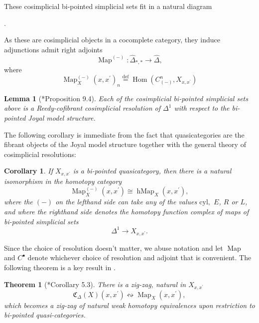 \documentclass[a4paper]{article}
\numberwithin{equation}{subsection}
\theoremstyle{plain}   %
\newtheorem{thm}[equation]{Theorem}
\newtheorem{cor}[equation]{Corollary}
\newtheorem{lemma}[equation]{Lemma}
\theoremstyle{definition}
\theoremstyle{remark}
\theoremstyle{plain}
\DeclareMathOperator{\Map}{Map}
\DeclareMathOperator{\Hom}{Hom}
\newcommand{\psh}[1]{\ensuremath{\widehat{#1}}}
\newcommand{\defeq}{\overset{\mathrm{def}}=}
\begin{document}
These cosimplicial bi-pointed simplicial sets fit in a natural diagram
\begin{center}
	.
\end{center}
As these are cosimplicial objects in a cocomplete category, they induce adjunctions admit right adjoints
\[
	\operatorname{Map}^{(-)}: \psh{\Delta}_{\ast,\ast} \to \psh{\Delta},
\]
where
\[
	\operatorname{Map}^{(-)}_X(x,x^\prime)_n\defeq \Hom(C^n_{(-)},X_{x,x^\prime})
\]
\begin{lemma}[\cite{ds2}*{Proposition 9.4}]
	Each of the cosimplicial bi-pointed simplicial sets above is a Reedy-cofibrant cosimplicial resolution of \(\Delta^1\) with respect to the bi-pointed Joyal model structure. 
\end{lemma}
The following corollary is immediate from the fact that quasicategories are the fibrant objects of the Joyal model structure together with the general theory of cosimplicial resolutions:
\begin{cor}
	If \(X_{x,x^\prime}\) is a bi-pointed quasicategory, then there is a natural isomorphism in the homotopy category
	\[
		\operatorname{Map}^{(-)}_X(x,x^\prime)\cong \operatorname{hMap}_X(x,x^\prime),
	\]
	where the \((-)\) on the lefthand side can take any of the values \(\mathrm{cyl},\) \(E\), \(R\) or \(L\), and where the righthand side denotes the homotopy function complex of maps of bi-pointed simplicial sets
	\[
		\Delta^1 \to X_{x,x^\prime}.
	\]
\end{cor}
Since the choice of resolution doesn't matter, we abuse notation and let \(\Map\) and \(C^\bullet\) denote whichever choice of resolution and adjoint that is convenient.
The following theorem is a key result in \cite{ds2}.  
\begin{thm}[\cite{ds2}*{Corollary 5.3}]
	There is a zig-zag, natural in \(X_{x,x^\prime}\)
	\[
		\mathfrak{C}_\Delta(X)(x,x^\prime) \leftrightsquigarrow \Map_X(x,x^\prime),
	\]
	which becomes a zig-zag of natural weak homotopy equivalences upon restriction to bi-pointed quasi-categories.
\end{thm}
\end{document}
